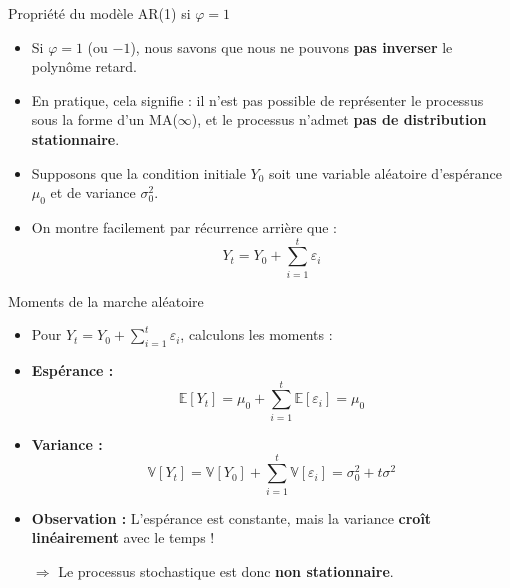 \documentclass[11pt,aspectratio=169]{beamer}
\newcommand{\E}{\mathbb{E}}
\newcommand{\Var}{\mathbb{V}}
\begin{document}
\begin{frame}{Propriété du modèle AR(1) si $\varphi = 1$}

\begin{itemize}

\item Si $\varphi = 1$ (ou $-1$), nous savons que nous ne pouvons \textbf{pas inverser} le polynôme retard.\newline

\item En pratique, cela signifie : il n'est pas possible de représenter le processus sous la forme d'un MA($\infty$), et le processus n'admet \textbf{pas de distribution stationnaire}.\newline

\item Supposons que la condition initiale $Y_0$ soit une variable aléatoire d'espérance $\mu_0$ et de variance $\sigma_0^2$.\newline

\item On montre facilement par récurrence arrière que :
\[
Y_t = Y_0 + \sum_{i=1}^{t} \varepsilon_i
\]

\end{itemize}
\end{frame}

\begin{frame}{Moments de la marche aléatoire}

\begin{itemize}

\item Pour $Y_t = Y_0 + \sum_{i=1}^{t} \varepsilon_i$, calculons les moments :\newline

\item \textbf{Espérance :}
\[
\E[Y_t] = \mu_0 + \sum_{i=1}^{t} \E[\varepsilon_i] = \mu_0
\]

\item \textbf{Variance :}
\[
\Var[Y_t] = \Var[Y_0] + \sum_{i=1}^{t} \Var[\varepsilon_i] = \sigma_0^2 + t \sigma^2
\]

\item \textbf{Observation :} L'espérance est constante, mais la variance \textbf{croît linéairement} avec le temps !

$\Rightarrow$ Le processus stochastique est donc \textbf{non stationnaire}.

\end{itemize}
\end{frame}
\end{document}
